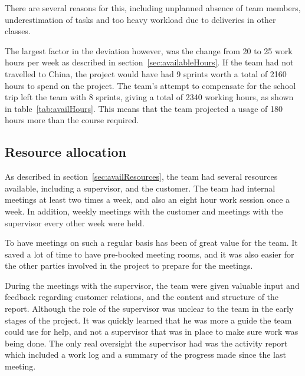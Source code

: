 There are several reasons for this, including unplanned absence of team members, underestimation of tasks and too heavy workload due to deliveries in other classes. 

The largest factor in the deviation however, was the change from 20 to 25 work hours per week as described in section~\ref{sec:availableHours}. If the team had not travelled to China, the project would have had 9 sprints worth a total of 2160 hours to spend on the project. The team's attempt to compensate for the school trip left the team with 8 sprints, giving a total of 2340 working hours, as shown in table~\ref{tab:availHours}. This means that the team projected a usage of 180 hours more than the course required.


\subsection{Resource allocation}
As described in section~\ref{sec:availResources}, the team had several resources available, including a supervisor, and the customer. The team had internal meetings at least two times a week, and also an eight hour work session once a week. In addition, weekly meetings with the customer and meetings with the supervisor every other week were held.

To have meetings on such a regular basis has been of great value for the team. It saved a lot of time to have pre-booked meeting rooms, and it was also easier for the other parties involved in the project to prepare for the meetings.

During the meetings with the supervisor, the team were given valuable input and feedback regarding customer relations, and the content and structure of the report. Although the role of the supervisor was unclear to the team in the early stages of the project. It was quickly learned that he was more a guide the team could use for help, and not a supervisor that was in place to make sure work was being done. The only real oversight the supervisor had was the activity report which included a work log and a summary of the progress made since the last meeting.

